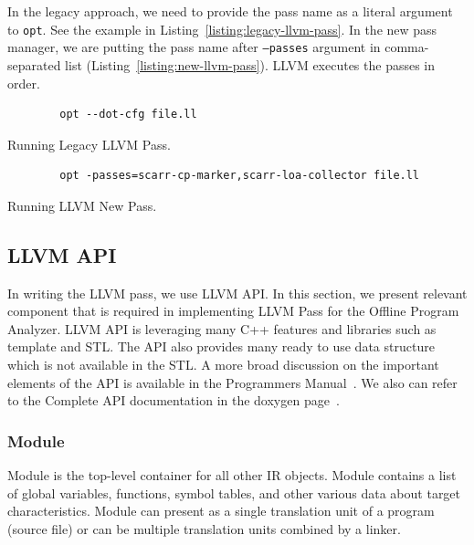 In the legacy approach, we need to provide the pass name as a literal argument
to \texttt{opt}. See the example in Listing~\ref{listing:legacy-llvm-pass}. In
the new pass manager, we are putting the pass name after \texttt{--passes}
argument in comma-separated list (Listing~\ref{listing:new-llvm-pass}). LLVM
executes the passes in order.

\begin{listing}[htbp]
    \begin{verbatim}
        opt --dot-cfg file.ll 
    \end{verbatim}
    \caption{Running Legacy LLVM Pass.}    
    \label{listing:legacy-llvm-pass}
\end{listing}

\begin{listing}[htpb]
    \begin{verbatim}
        opt -passes=scarr-cp-marker,scarr-loa-collector file.ll 
    \end{verbatim}
    \caption{Running LLVM New Pass.}    
    \label{listing:new-llvm-pass}
\end{listing}

\subsection{LLVM API}

In writing the LLVM pass, we use LLVM API. In this section, we present relevant
component that is required in implementing LLVM Pass for the Offline Program
Analyzer. LLVM API is leveraging many C++ features and libraries such as
template and STL. The API also provides many ready to use data structure which
is not available in the STL. A more broad discussion on the important elements
of the API is available in the Programmers Manual~\cite{LLVMProgrammerManuala}.
We also can refer to the Complete API documentation in the doxygen
page~\cite{LLVMLLVMa}.

\subsubsection{Module}

Module is the top-level container for all other IR objects. Module contains a
list of global variables, functions, symbol tables, and other various data about
target characteristics. Module can present as a single translation unit of a
program (source file) or can be multiple translation units combined by a linker.


